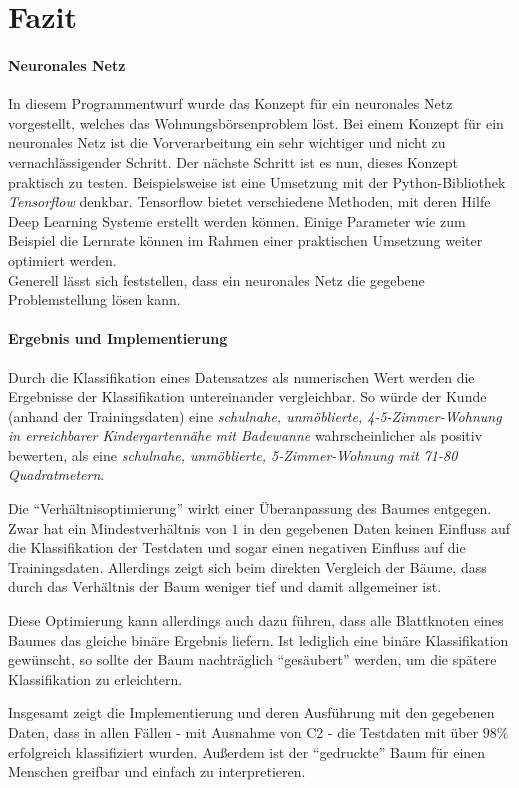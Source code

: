 \section{Fazit}\label{sec:fazit}
\paragraph{Neuronales Netz}
In diesem Programmentwurf wurde das Konzept für ein neuronales Netz vorgestellt,
welches das Wohnungsbörsenproblem löst.
Bei einem Konzept für ein neuronales Netz ist die Vorverarbeitung ein sehr wichtiger und nicht zu vernachlässigender Schritt.
Der nächste Schritt ist es nun, dieses Konzept praktisch zu testen.
Beispielsweise ist eine Umsetzung mit der Python-Bibliothek \emph{Tensorflow} denkbar.
Tensorflow bietet verschiedene Methoden, mit deren Hilfe Deep Learning Systeme erstellt werden können.
Einige Parameter wie zum Beispiel die Lernrate können im Rahmen einer praktischen Umsetzung weiter optimiert werden. \\
Generell lässt sich feststellen, dass ein neuronales Netz die gegebene Problemstellung lösen kann.

\paragraph{Ergebnis und Implementierung}
Durch die Klassifikation eines Datensatzes als numerischen Wert werden die Ergebnisse der Klassifikation untereinander vergleichbar.
So würde der Kunde (anhand der Trainingsdaten) eine  \emph{schulnahe, unmöblierte, 4-5-Zimmer-Wohnung in erreichbarer Kindergartennähe mit Badewanne} wahrscheinlicher als positiv bewerten,
als eine \emph{schulnahe, unmöblierte, 5-Zimmer-Wohnung mit 71-80 Quadratmetern}.

Die \enquote{Verhältnisoptimierung} wirkt einer Überanpassung des Baumes entgegen.
Zwar hat ein Mindestverhältnis von $1$ in den gegebenen Daten keinen Einfluss auf die Klassifikation der Testdaten und sogar einen negativen Einfluss auf die Trainingsdaten.
Allerdings zeigt sich beim direkten Vergleich der Bäume,
dass durch das Verhältnis der Baum weniger tief und damit allgemeiner ist.

Diese Optimierung kann allerdings auch dazu führen,
dass alle Blattknoten eines Baumes das gleiche binäre Ergebnis liefern.
Ist lediglich eine binäre Klassifikation gewünscht,
so sollte der Baum nachträglich \enquote{gesäubert} werden,
um die spätere Klassifikation zu erleichtern.

Insgesamt zeigt die Implementierung und deren Ausführung mit den gegebenen Daten,
dass in allen Fällen - mit Ausnahme von C2 - die Testdaten mit über $98\%$ erfolgreich klassifiziert wurden.
Außerdem ist der \enquote{gedruckte} Baum für einen Menschen greifbar und einfach zu interpretieren.